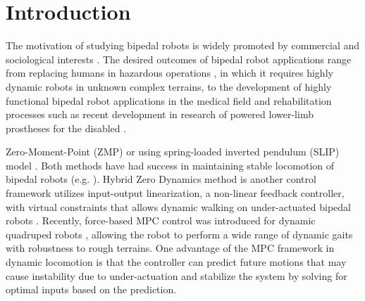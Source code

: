

\section{Introduction}
\label{sec:Introduction}

The motivation of studying bipedal robots is widely promoted by commercial and sociological interests \cite{westervelt2018feedback}. The desired outcomes of bipedal robot applications range from replacing humans in hazardous operations \cite{chen2020a}, in which it requires highly dynamic robots in unknown complex terrains, to the development of highly functional bipedal robot applications in the medical field and rehabilitation processes such as recent development in research of powered lower-limb prostheses for the disabled \cite{zhao2017first}. 



 Zero-Moment-Point (ZMP) or using spring-loaded inverted pendulum (SLIP) model \cite{ames2012dynamically,kajita2006biped,holmes2006dynamics}. Both methods have had success in maintaining stable locomotion of bipedal robots (e.g. \cite{ames2012dynamically,holmes2006dynamics}). Hybrid Zero Dynamics method is another control framework utilizes input-output linearization, a non-linear feedback controller, with virtual constraints that allows dynamic walking on under-actuated bipedal robots \cite{westervelt2018feedback, nguyen2016dynamic, nguyen2017dynamic}. 
Recently, force-based MPC control was introduced for dynamic quadruped robots \cite{di2018dynamic}, allowing the robot to perform a wide range of dynamic gaits with robustness to rough terrains. One advantage of the MPC framework in dynamic locomotion is that the controller can predict future motions that may cause instability due to under-actuation and stabilize the system by solving for optimal inputs based on the prediction. 

